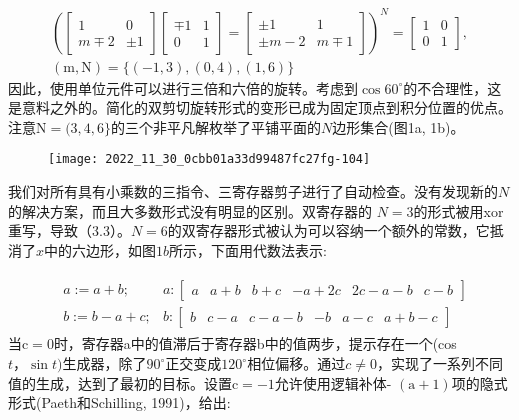 \begin{CJK}{UTF8}{gbsn}
$$
\begin{aligned}
\left(\begin{bmatrix}
 1 & 0\\
 m\mp2 & \pm 1
\end{bmatrix}\begin{bmatrix}
\mp 1 & 1\\
0 & 1
\end{bmatrix}=\begin{bmatrix}
\pm1 & 1 \\
\pm m-2 & m\mp 1
\end{bmatrix}\right)^N=\begin{bmatrix}
1 & 0\\
0 &1
\end{bmatrix},\\
(\mathrm{m}, \mathrm{N})=\{(-1,3),(0,4),(1,6)\}
\end{aligned}
$$
因此，使用单位元件可以进行三倍和六倍的旋转。考虑到$\cos 60^{\circ}$的不合理性，这是意料之外的。简化的双剪切旋转形式的变形已成为固定顶点到积分位置的优点。注意$\mathrm{N}=(3,4,6\}$的三个非平凡解枚举了平铺平面的$N$边形集合(图1a, 1b)。

\begin{figure}[htbp]
\texttt{[image: 2022\_11\_30\_0cbb01a33d99487fc27fg-104]}
\caption{}
\end{figure}

我们对所有具有小乘数的三指令、三寄存器剪子进行了自动检查。没有发现新的$N$的解决方案，而且大多数形式没有明显的区别。双寄存器的 $N=3$的形式被用xor重写，导致（3.3）。$N=6$的双寄存器形式被认为可以容纳一个额外的常数，它抵消了$x$中的六边形，如图$1 b$所示，下面用代数法表示:

\begin{align}
\begin{aligned}
&a:=a+b; &a:\begin{bmatrix}
a &a+b & b+c &-a+2c & 2c-a-b &c-b 
\end{bmatrix}\\
&b:=b-a+c; &b:\begin{bmatrix}
b & c-a & c-a-b & -b & a-c & a+b-c
\end{bmatrix}
\end{aligned}
\tag{6.1}
\end{align}
当$\mathrm{c}=0$时，寄存器a中的值滞后于寄存器b中的值两步，提示存在一个(cos $t， \sin t)$生成器，除了$90^{\circ}$正交变成$120^{\circ}$相位偏移。通过$c \neq 0$，实现了一系列不同值的生成，达到了最初的目标。设置$\mathrm{c}=-1$允许使用逻辑补体- $(\mathrm{a}+1)$项的隐式形式(Paeth和Schilling, 1991)，给出:


\end{CJK}
